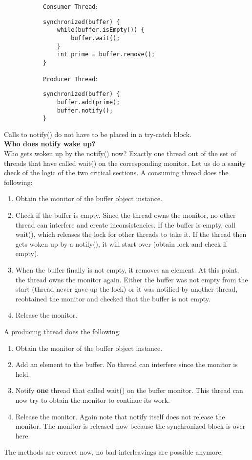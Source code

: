 \documentclass[main.tex]{subfiles}
\begin{document}
\begin{figure}[H] \begin{subfigure}[t]{.52\textwidth}
        \texttt{Consumer Thread}:
        \begin{verbatim}
synchronized(buffer) {
    while(buffer.isEmpty()) {
        buffer.wait();
    }
    int prime = buffer.remove();
}
        \end{verbatim}
    \end{subfigure}%
    \begin{subfigure}[t]{.52\textwidth}
        \texttt{Producer Thread}:
        \begin{verbatim}
synchronized(buffer) {
    buffer.add(prime);
    buffer.notify();
}
        \end{verbatim}
    \end{subfigure}
\end{figure}
Calls to notify() do not have to be placed in a try-catch block. \\[3mm]
\textbf{Who does notify wake up?}\\
Who gets woken up by the notify() now? Exactly one thread out of the set of threads that have called wait() on the corresponding monitor. Let us do a sanity check of the logic of the two critical sections. A consuming thread does the following:
\begin{enumerate}
  \item Obtain the monitor of the buffer object instance.
  \item Check if the buffer is empty. Since the thread owns the monitor, no other thread can interfere and create inconsistencies. If the buffer is empty, call wait(), which releases the lock for other threads to take it. If the thread then gets woken up by a notify(), it will start over (obtain lock and check if empty).
  \item When the buffer finally is not empty, it removes an element. At this point, the thread owns the monitor again. Either the buffer was not empty from the start (thread never gave up the lock) or it was notified by another thread, reobtained the monitor and checked that the buffer is not empty.
  \item Release the monitor.
\end{enumerate}
A producing thread does the following:
\begin{enumerate}
  \item Obtain the monitor of the buffer object instance.
  \item Add an element to the buffer. No thread can interfere since the monitor is held.
  \item Notify \textbf{one} thread that called wait() on the buffer monitor. This thread can now try to obtain the monitor to continue its work.
  \item Release the monitor. Again note that notify itself does not release the monitor. The monitor is released now because the synchronized block is over here.
\end{enumerate}
The methods are correct now, no bad interleavings are possible anymore.
\end{document}
